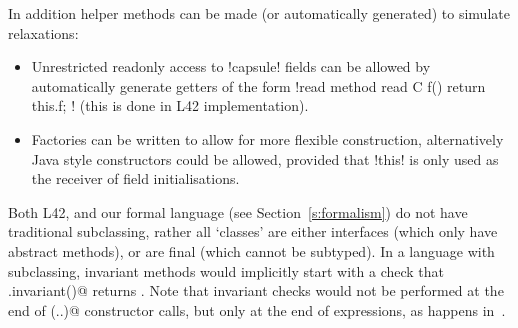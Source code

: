 In addition helper methods can be made (or automatically generated) to simulate relaxations:
\begin{itemize}
	\item Unrestricted readonly access to \Q!capsule! fields can be allowed by automatically generate getters of the form \Q!read method read C f() { return this.f; }! (this is done in L42 implementation).
	\item Factories can be written to allow for more flexible construction, alternatively Java style constructors could be allowed, provided that \Q!this! is only used as the receiver of field initialisations.
\end{itemize}
Both L42, and our formal language (see Section~\ref{s:formalism}) do not have traditional subclassing, rather all `classes' are either interfaces (which only have abstract methods), or are final (which cannot be subtyped). In a language with subclassing, invariant methods would implicitly start with a check that \Q@super.invariant()@ returns \Q@true@. Note that invariant checks would not be performed at the end of \Q@super(..)@ constructor calls, but only at the end of \Q@new@ expressions, as happens in~\cite{feldman2006jose}.

\begin{comment}
Justifications:

This prevents objects from escaping their constructor partially initialised, and of course prevents explicitly calling \Q@invariant@ inside of \Q@invariants@ and constructors bodies, but most importantly, together with our other restrictions, it prevents \Q@this@, or an alias to \Q@this@, from being passed around to arbitrary code.
To provide more flexible initialisation one could always make a factory method.

While mutating the ROG of a \Q@capsule@ field mentioned in the invariant, the containing object may become invalid.
The restrictions over capsule mutators
enforce that such containing object is inaccessible.

\end{comment}

